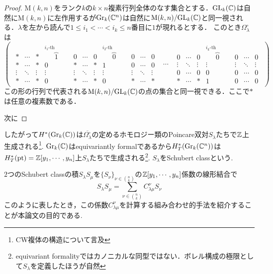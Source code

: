 \begin{proof}
  $\text{M}(k,n)$をランク$k$の$k\times n$複素行列全体のなす集合とする．$\text{GL}_k(\mathbb{C})$は自然に$\text{M}(k, n)$に左作用するが$\text{Gr}_k(\mathbb{C}^n)$は自然に$\text{M}(k,n)/\text{GL}_k(\mathbb{C})$と同一視される．$\lambda$を左から読んで$1\leq i_1<\cdots<i_k\leq n$番目に$1$が現れるとする．
  このとき$\Omega_\lambda^\circ$は
  \[
  \left(\begin{array}{ccc}
    {\begin{array}{ccccccccccc}
    * & \cdots & * & \overbrace{1}^{i_1\text{-th column}} & 0 & \cdots & 0 & \overbrace{0}^{i_{2}\text{-th column}} & 0 & \cdots & 0\\
    * & \cdots & * & 0 & * & \cdots & * & 1 & 0 & \cdots & 0\\
    \vdots & \ddots & \vdots & \vdots & \vdots & \ddots & \vdots & \vdots & \vdots & \ddots & \vdots\\
    * & \cdots & * & 0 & * & \cdots & * & 0 & * & \cdots & * 
    \end{array}} & \cdots & 
    {\begin{array}{ccccccc}
    0 & \cdots & 0 & \overbrace{0}^{i_{k}\text{-th column}} & 0 &\cdots & 0\\
    \vdots & \ddots & \vdots & \vdots & \vdots & \ddots & \vdots\\
    0 & \cdots & 0 & 0 & 0 & \cdots & 0\\
    * & \cdots & * & 1 & 0 & \cdots & 0
    \end{array}}
  \end{array}\right)
  \]
  この形の行列で代表される$\text{M}(k,n)/\text{GL}_k(\mathbb{C})$の点の集合と同一視できる．ここで$*$は任意の複素数である．

  次に
\end{proof}

したがって$H^*(\text{Gr}_k(\mathbb{C}))$は$\overline{\Omega_\lambda^\circ}$の定めるホモロジー類のPoincare双対$S_\lambda$たちで$\mathbb{Z}$上生成される\footnote{CW複体の構造について言及}. $\text{Gr}_k(\mathbb{C})$はequivariantly formalであるから$H^*_T(\text{Gr}_k(\mathbb{C}^n))$は$H^*_T(\text{pt})=\mathbb{Z}[y_1,\cdots,y_n]$上$S_\lambda$たちで生成される\footnote{equivariant formalityではカノニカルな同型ではない．ボレル構成の極限として$S_\lambda$を定義したほうが自然}. $S_\lambda$をSchubert classという.

$2$つのSchubert classの積$S_\lambda S_\mu$を$\{S_\nu\}_{\nu\in\binom{n}{k}}$の$\mathbb{Z}[y_1,\cdots,y_n]$係数の線形結合で
\[
S_\lambda S_\mu=\sum_{\nu\in\binom{n}{k}}C^\nu_{\lambda\mu}S_\nu
\]
このように表したとき，この係数$C^{\nu}_{\lambda\mu}$を計算する組み合わせ的手法を紹介することが本論文の目的である.





